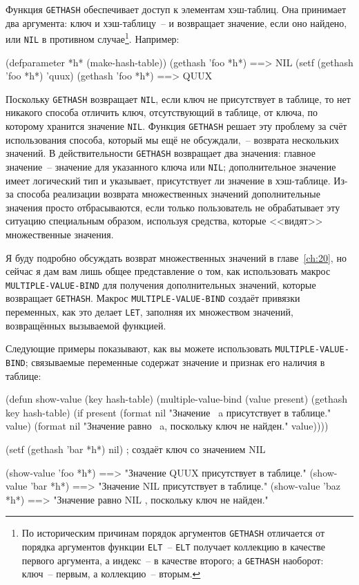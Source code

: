 Функция \lstinline{GETHASH} обеспечивает доступ к элементам хэш-таблиц.  Она принимает два
аргумента: ключ и хэш-таблицу~-- и возвращает значение, если оно найдено, или \lstinline{NIL} в
противном случае\footnote{По историческим причинам порядок аргументов \lstinline{GETHASH}
  отличается от порядка аргументов функции \lstinline{ELT}~-- \lstinline{ELT} получает коллекцию в
  качестве первого аргумента, а индекс~-- в качестве второго; а \lstinline{GETHASH} наоборот:
  ключ~-- первым, а коллекцию~-- вторым.}.  Например:

\begin{myverb}
(defparameter *h* (make-hash-table))
(gethash 'foo *h*) ==> NIL
(setf (gethash 'foo *h*) 'quux)
(gethash 'foo *h*) ==> QUUX
\end{myverb}

Поскольку \lstinline{GETHASH} возвращает \lstinline{NIL}, если ключ не присутствует в таблице, то нет
никакого способа отличить ключ, отсутствующий в таблице, от ключа, по которому хранится
значение \lstinline{NIL}.  Функция \lstinline{GETHASH} решает эту проблему за счёт использования
способа, который мы ещё не обсуждали,~-- возврата нескольких значений.  В действительности
\lstinline{GETHASH} возвращает два значения: главное значение~-- значение для указанного ключа
или \lstinline{NIL};  дополнительное значение имеет логический тип и указывает, присутствует ли
значение в хэш-таблице.  Из-за способа реализации возврата множественных значений
дополнительные значения просто отбрасываются, если только пользователь не обрабатывает эту
ситуацию специальным образом, используя средства, которые <<видят>> множественные значения.

Я буду подробно обсуждать возврат множественных значений в главе~\ref{ch:20}, но сейчас я
дам вам лишь общее представление о том, как использовать макрос \lstinline{MULTIPLE-VALUE-BIND}
для получения дополнительных значений, которые возвращает \lstinline{GETHASH}.  Макрос
\lstinline{MULTIPLE-VALUE-BIND} создаёт привязки переменных, как это делает \lstinline{LET},
заполняя их множеством значений, возвращённых вызываемой функцией.

Следующие примеры показывают, как вы можете использовать \lstinline{MULTIPLE-VALUE-BIND};
связываемые переменные содержат значение и признак его наличия в таблице:

\begin{myverb}  
(defun show-value (key hash-table)
  (multiple-value-bind (value present) (gethash key hash-table)
    (if present
      (format nil "Значение ~a присутствует в таблице." value)
      (format nil "Значение равно ~a, поскольку ключ не найден." value))))

(setf (gethash 'bar *h*) nil) ; создаёт ключ со значением NIL

(show-value 'foo *h*) ==> "Значение QUUX присутствует в таблице."
(show-value 'bar *h*) ==> "Значение NIL присутствует в таблице."
(show-value 'baz *h*) ==> "Значение равно NIL , поскольку ключ не найден."
\end{myverb}

